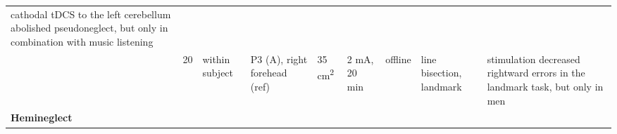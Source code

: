 \documentclass[11pt,]{memoir}
\begin{document}
\begin{longtable}[]{@{}lllllllll@{}}
\begin{minipage}[t]{0.28\columnwidth}
cathodal tDCS to the left cerebellum abolished
pseudoneglect, but only in combination with music listening\strut
\end{minipage}\tabularnewline
\begin{minipage}[t]{0.09\columnwidth}\raggedright
\textcite{DeTommaso2014}\strut
\end{minipage} & \begin{minipage}[t]{0.02\columnwidth}\raggedright
20\strut
\end{minipage} & \begin{minipage}[t]{0.04\columnwidth}\raggedright
within
subject\strut
\end{minipage} & \begin{minipage}[t]{0.10\columnwidth}\raggedright
P3 (A), right
forehead (ref)\strut
\end{minipage} & \begin{minipage}[t]{0.04\columnwidth}\raggedright
35
cm\textsuperscript{2}\strut
\end{minipage} & \begin{minipage}[t]{0.04\columnwidth}\raggedright
2 mA,
20 min\strut
\end{minipage} & \begin{minipage}[t]{0.04\columnwidth}\raggedright
offline\strut
\end{minipage} & \begin{minipage}[t]{0.10\columnwidth}\raggedright
line bisection,
landmark\strut
\end{minipage} & \begin{minipage}[t]{0.28\columnwidth}\raggedright
stimulation decreased rightward errors in the landmark task,
but only in men\strut
\end{minipage}\tabularnewline
\begin{minipage}[t]{0.09\columnwidth}\raggedright
\textbf{Hemineglect}\strut
\end{minipage} & \begin{minipage}[t]{0.02\columnwidth}\raggedright
\strut
\end{minipage} & \begin{minipage}[t]{0.04\columnwidth}\raggedright
\strut
\end{minipage} & \begin{minipage}[t]{0.10\columnwidth}\raggedright
\strut
\end{minipage} & \begin{minipage}[t]{0.04\columnwidth}\raggedright
\strut
\end{minipage} & \begin{minipage}[t]{0.04\columnwidth}\raggedright

\end{minipage}
\end{longtable}
\end{document}
